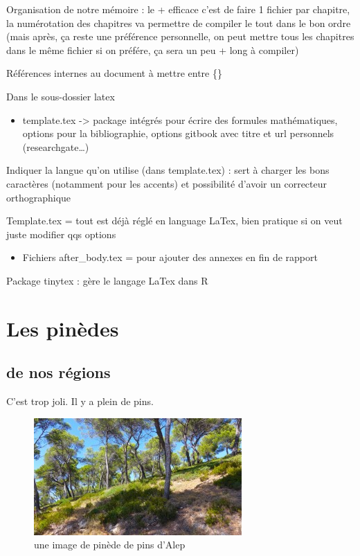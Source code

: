 \documentclass[
  12pt,
  american,
  a4paper,
  extrafontsizes,onecolumn,openright
  ]{memoir}
\providecommand{\tightlist}{%
  \setlength{\itemsep}{0pt}\setlength{\parskip}{0pt}}
\begin{document}
Organisation de notre mémoire : le + efficace c'est de faire 1 fichier par chapitre, la numérotation des chapitres va permettre de compiler le tout dans le bon ordre (mais après, ça reste une préférence personnelle, on peut mettre tous les chapitres dans le même fichier si on préfére, ça sera un peu + long à compiler)

Références internes au document à mettre entre \{\}

Dans le sous-dossier latex

\begin{itemize}
\tightlist
\item
  template.tex -\textgreater{} package intégrés pour écrire des formules mathématiques, options pour la bibliographie, options gitbook avec titre et url personnels (researchgate\ldots)
\end{itemize}

Indiquer la langue qu'on utilise (dans template.tex) : sert à charger les bons caractères (notamment pour les accents) et possibilité d'avoir un correcteur orthographique

Template.tex = tout est déjà réglé en language LaTex, bien pratique si on veut juste modifier qqs options

\begin{itemize}
\tightlist
\item
  Fichiers after\_body.tex = pour ajouter des annexes en fin de rapport
\end{itemize}

Package tinytex : gère le langage LaTex dans R

\hypertarget{les-pinuxe8des}{%
\chapter{Les pinèdes}\label{les-pinuxe8des}}

\hypertarget{de-nos-ruxe9gions}{%
\section{de nos régions}\label{de-nos-ruxe9gions}}

C'est trop joli. Il y a plein de pins.

\begin{figure}
\centering
\includegraphics{images/pinede.jpg}
\caption{une image de pinède de pins d'Alep}
\end{figure}
\end{document}

